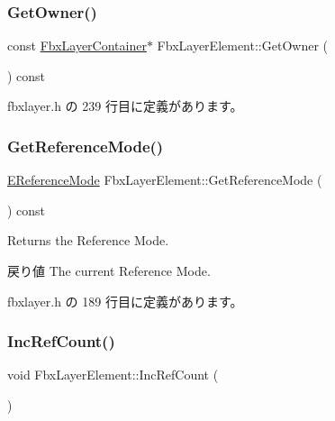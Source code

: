 \subsubsection{\texorpdfstring{Get\+Owner()}{GetOwner()}}
{\footnotesize\ttfamily const \hyperlink{class_fbx_layer_container}{Fbx\+Layer\+Container}$\ast$ Fbx\+Layer\+Element\+::\+Get\+Owner (\begin{DoxyParamCaption}{ }\end{DoxyParamCaption}) const\hspace{0.3cm}{\ttfamily [inline]}}



 fbxlayer.\+h の 239 行目に定義があります。

\mbox{\label{class_fbx_layer_element_ae135c9331612660680a0acc97de02d60}} 
\subsubsection{\texorpdfstring{Get\+Reference\+Mode()}{GetReferenceMode()}}
{\footnotesize\ttfamily \hyperlink{class_fbx_layer_element_a00f04654580ca9b2f5d292c11abd83fc}{E\+Reference\+Mode} Fbx\+Layer\+Element\+::\+Get\+Reference\+Mode (\begin{DoxyParamCaption}{ }\end{DoxyParamCaption}) const\hspace{0.3cm}{\ttfamily [inline]}}

Returns the Reference Mode. \begin{DoxyReturn}{戻り値}
The current Reference Mode. 
\end{DoxyReturn}


 fbxlayer.\+h の 189 行目に定義があります。

\mbox{\label{class_fbx_layer_element_a00a11912a2cca47c811c8d23bb3ede51}} 
\subsubsection{\texorpdfstring{Inc\+Ref\+Count()}{IncRefCount()}}
{\footnotesize\ttfamily void Fbx\+Layer\+Element\+::\+Inc\+Ref\+Count (\begin{DoxyParamCaption}{ }\end{DoxyParamCaption})\hspace{0.3cm}{\ttfamily [inline]}}



